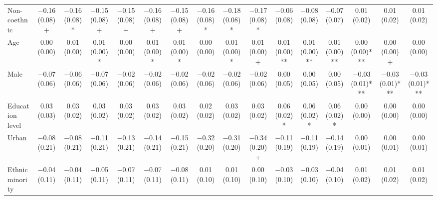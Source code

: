 \begin{table}
\begin{tabular}[t]{lccccccccccccccc}
Non-coethnic & \num{-0.16} (\num{0.08})+ & \num{-0.16} (\num{0.08})* & \num{-0.15} (\num{0.08})+ & \num{-0.15} (\num{0.08})+ & \num{-0.16} (\num{0.08})+ & \num{-0.15} (\num{0.08})+ & \num{-0.16} (\num{0.08})* & \num{-0.18} (\num{0.08})* & \num{-0.17} (\num{0.08})* & \num{-0.06} (\num{0.08}) & \num{-0.08} (\num{0.08}) & \num{-0.07} (\num{0.07}) & \num{0.01} (\num{0.02}) & \num{0.01} (\num{0.02}) & \num{0.01} (\num{0.02})\\
Age & \num{0.00} (\num{0.00}) & \num{0.01} (\num{0.00}) & \num{0.01} (\num{0.00})* & \num{0.00} (\num{0.00}) & \num{0.01} (\num{0.00})* & \num{0.01} (\num{0.00})* & \num{0.00} (\num{0.00}) & \num{0.01} (\num{0.00})* & \num{0.01} (\num{0.00})+ & \num{0.01} (\num{0.00})** & \num{0.01} (\num{0.00})** & \num{0.01} (\num{0.00})** & \num{0.00} (\num{0.00})*** & \num{0.00} (\num{0.00})+ & \num{0.00} (\num{0.00})\\
Male & \num{-0.07} (\num{0.06}) & \num{-0.06} (\num{0.06}) & \num{-0.07} (\num{0.06}) & \num{-0.02} (\num{0.06}) & \num{-0.02} (\num{0.06}) & \num{-0.02} (\num{0.06}) & \num{-0.02} (\num{0.06}) & \num{-0.02} (\num{0.06}) & \num{-0.02} (\num{0.06}) & \num{0.00} (\num{0.05}) & \num{0.00} (\num{0.05}) & \num{0.00} (\num{0.05}) & \num{-0.03} (\num{0.01})*** & \num{-0.03} (\num{0.01})*** & \num{-0.03} (\num{0.01})***\\
Education level & \num{0.03} (\num{0.03}) & \num{0.03} (\num{0.02}) & \num{0.03} (\num{0.02}) & \num{0.03} (\num{0.02}) & \num{0.03} (\num{0.02}) & \num{0.03} (\num{0.02}) & \num{0.02} (\num{0.02}) & \num{0.03} (\num{0.02}) & \num{0.03} (\num{0.02}) & \num{0.06} (\num{0.02})* & \num{0.06} (\num{0.02})* & \num{0.06} (\num{0.02})* & \num{0.00} (\num{0.00}) & \num{0.00} (\num{0.00}) & \num{0.00} (\num{0.00})\\
Urban & \num{-0.08} (\num{0.21}) & \num{-0.08} (\num{0.21}) & \num{-0.11} (\num{0.21}) & \num{-0.13} (\num{0.21}) & \num{-0.14} (\num{0.21}) & \num{-0.15} (\num{0.21}) & \num{-0.32} (\num{0.20}) & \num{-0.31} (\num{0.20}) & \num{-0.34} (\num{0.20})+ & \num{-0.11} (\num{0.19}) & \num{-0.11} (\num{0.19}) & \num{-0.14} (\num{0.19}) & \num{0.00} (\num{0.01}) & \num{0.00} (\num{0.01}) & \num{0.00} (\num{0.01})\\
Ethnic minority & \num{-0.04} (\num{0.11}) & \num{-0.04} (\num{0.11}) & \num{-0.05} (\num{0.11}) & \num{-0.07} (\num{0.11}) & \num{-0.07} (\num{0.11}) & \num{-0.08} (\num{0.11}) & \num{0.01} (\num{0.10}) & \num{0.01} (\num{0.10}) & \num{0.00} (\num{0.10}) & \num{-0.03} (\num{0.10}) & \num{-0.03} (\num{0.10}) & \num{-0.04} (\num{0.10}) & \num{0.01} (\num{0.02}) & \num{0.01} (\num{0.02}) & \num{0.01} (\num{0.02})\\

\end{tabular}
\end{table}
